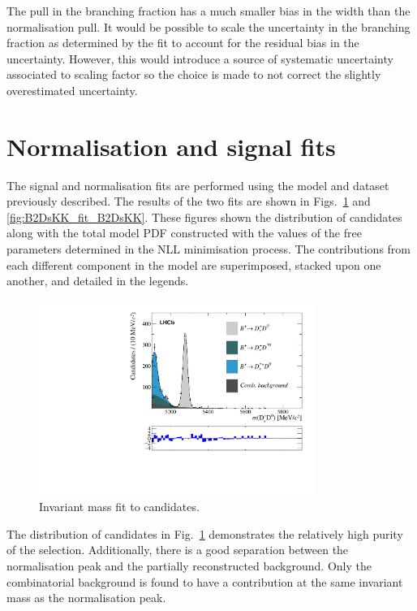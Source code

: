 The pull in the branching fraction has a much smaller bias in the width than the normalisation pull.
It would be possible to scale the uncertainty in the branching fraction as determined by the fit to account for the residual bias in the uncertainty. However, this would introduce a source of systematic uncertainty associated to scaling factor so the choice is made to not correct the slightly overestimated uncertainty. 

\section{Normalisation and signal fits}

The signal and normalisation fits are performed using the model and dataset previously described. The results of the two fits are shown in Figs.~\ref{fig:B2DsKK_fit_B2DsD0} and \ref{fig:B2DsKK_fit_B2DsKK}. These figures shown the distribution of \Bp candidates along with the total model PDF constructed with the values of the free parameters determined in the NLL minimisation process. The contributions from each different component in the model are superimposed, stacked upon one another, and detailed in the legends.

\begin{figure}[!h]
    \centering
    \includegraphics[width=0.8\textwidth]{figs/B2DsKK/Fit_DsD0.pdf}
    \caption{Invariant mass fit to \decay{\Bp}{\Dsp\Dzb} candidates.}
    \label{fig:B2DsKK_fit_B2DsD0}   
\end{figure}

The distribution of \decay{\Bp}{\Dsp\Dzb} candidates in Fig.~\ref{fig:B2DsKK_fit_B2DsD0} demonstrates the relatively high purity of the selection. Additionally, there is a good separation between the normalisation peak and the partially reconstructed background. Only the combinatorial background is found to have a contribution at the same invariant mass as the normalisation peak. 


